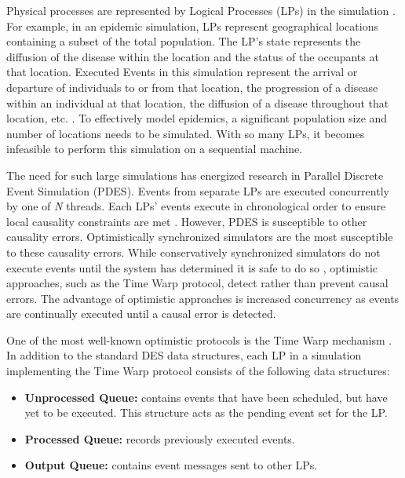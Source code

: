 \documentclass[11pt]{book}
\begin{document}
Physical processes are represented by Logical Processes (LPs) in the simulation
\cite{des_misra}.  For example, in an epidemic simulation, LPs represent
geographical locations containing a subset of the total population.  The LP's
state represents the diffusion of the disease within the location and the status
of the occupants at that location.  Executed Events in this simulation represent
the arrival or departure of individuals to or from that location, the
progression of a disease within an individual at that location, the diffusion of
a disease throughout that location, etc. \cite{epidemic}. To effectively model
epidemics, a significant population size and number of locations needs to be
simulated.  With so many LPs, it becomes infeasible to perform this simulation
on a sequential machine.  

The need for such large simulations has energized research in Parallel Discrete
Event Simulation (PDES).  Events from separate LPs are executed concurrently by
one of \emph{N} threads.  Each LPs' events execute in chronological order to
ensure local causality constraints are met \cite{fujimoto}.  However, PDES is
susceptible to other causality errors.  Optimistically synchronized simulators
are the most susceptible to these causality errors.  While conservatively synchronized
simulators do not execute events until the system has determined it is safe to
do so \cite{fujimoto}, optimistic approaches, such as the Time Warp protocol,
detect rather than prevent causal errors. The advantage of optimistic approaches
is increased concurrency as events are continually executed until a causal error
is detected. 

One of the most well-known optimistic protocols is the Time Warp mechanism
\cite{fujimoto}.  In addition to the standard DES data structures, each LP in a simulation
implementing the Time Warp protocol consists of the following data structures:

\begin{itemize}
  \item \textbf{Unprocessed Queue:} contains events that have been scheduled, but have yet
    to be executed.  This structure acts as the pending event set for the LP.
  \item\textbf{Processed Queue:} records previously executed events.
  \item\textbf{Output Queue:} contains event messages sent to other LPs.
\end{itemize}
\end{document}
